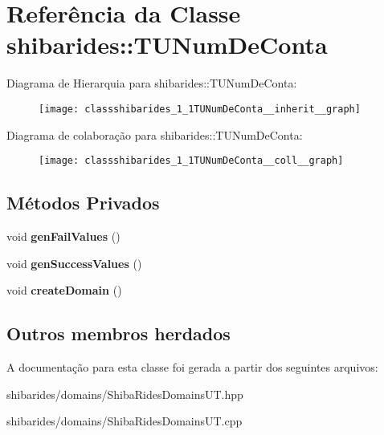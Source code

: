 \hypertarget{classshibarides_1_1TUNumDeConta}{}\section{Referência da Classe shibarides\+:\+:T\+U\+Num\+De\+Conta}
\label{classshibarides_1_1TUNumDeConta}


Diagrama de Hierarquia para shibarides\+:\+:T\+U\+Num\+De\+Conta\+:\nopagebreak
\begin{figure}[H]
\begin{center}
\leavevmode
\texttt{[image: classshibarides\_1\_1TUNumDeConta\_\_inherit\_\_graph]}
\end{center}
\end{figure}


Diagrama de colaboração para shibarides\+:\+:T\+U\+Num\+De\+Conta\+:\nopagebreak
\begin{figure}[H]
\begin{center}
\leavevmode
\texttt{[image: classshibarides\_1\_1TUNumDeConta\_\_coll\_\_graph]}
\end{center}
\end{figure}
\subsection*{Métodos Privados}
\begin{DoxyCompactItemize}
\item 
void {\bfseries gen\+Fail\+Values} ()\hypertarget{classshibarides_1_1TUNumDeConta_af8cc65b26c3ed15ffe94c70cf46803a4}{}\label{classshibarides_1_1TUNumDeConta_af8cc65b26c3ed15ffe94c70cf46803a4}

\item 
void {\bfseries gen\+Success\+Values} ()\hypertarget{classshibarides_1_1TUNumDeConta_ac363d736ea593fe866657997e5f11a8a}{}\label{classshibarides_1_1TUNumDeConta_ac363d736ea593fe866657997e5f11a8a}

\item 
void {\bfseries create\+Domain} ()\hypertarget{classshibarides_1_1TUNumDeConta_ad1f293790ffc9a2c55ab3dbfa4422931}{}\label{classshibarides_1_1TUNumDeConta_ad1f293790ffc9a2c55ab3dbfa4422931}

\end{DoxyCompactItemize}
\subsection*{Outros membros herdados}


A documentação para esta classe foi gerada a partir dos seguintes arquivos\+:\begin{DoxyCompactItemize}
\item 
shibarides/domains/Shiba\+Rides\+Domains\+U\+T.\+hpp\item 
shibarides/domains/Shiba\+Rides\+Domains\+U\+T.\+cpp\end{DoxyCompactItemize}
